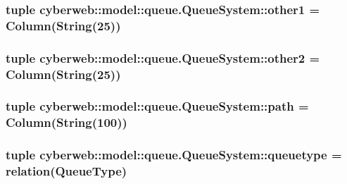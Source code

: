 \hypertarget{classcyberweb_1_1model_1_1queue_1_1_queue_system_a6014b2de013484a50c8fb3b5dd8580ca}{
\subsubsection[{other1}]{\setlength{\rightskip}{0pt plus 5cm}tuple {\bf cyberweb\-::model\-::queue.\-Queue\-System\-::other1} = \-Column(\-String(25))}}\label{classcyberweb_1_1model_1_1queue_1_1_queue_system_a6014b2de013484a50c8fb3b5dd8580ca}
\hypertarget{classcyberweb_1_1model_1_1queue_1_1_queue_system_a6759054cfd880d4fb01b12086d53633a}{
\subsubsection[{other2}]{\setlength{\rightskip}{0pt plus 5cm}tuple {\bf cyberweb\-::model\-::queue.\-Queue\-System\-::other2} = \-Column(\-String(25))}}\label{classcyberweb_1_1model_1_1queue_1_1_queue_system_a6759054cfd880d4fb01b12086d53633a}
\hypertarget{classcyberweb_1_1model_1_1queue_1_1_queue_system_a8a8b1467e4751dd9f255a0da6e9f06e3}{
\subsubsection[{path}]{\setlength{\rightskip}{0pt plus 5cm}tuple {\bf cyberweb\-::model\-::queue.\-Queue\-System\-::path} = \-Column(\-String(100))}}\label{classcyberweb_1_1model_1_1queue_1_1_queue_system_a8a8b1467e4751dd9f255a0da6e9f06e3}
\hypertarget{classcyberweb_1_1model_1_1queue_1_1_queue_system_aa5cdabc73ac8263a80a5cfc4e6255044}{
\subsubsection[{queuetype}]{\setlength{\rightskip}{0pt plus 5cm}tuple {\bf cyberweb\-::model\-::queue.\-Queue\-System\-::queuetype} = relation({\bf \-Queue\-Type})}}\label{classcyberweb_1_1model_1_1queue_1_1_queue_system_aa5cdabc73ac8263a80a5cfc4e6255044}
